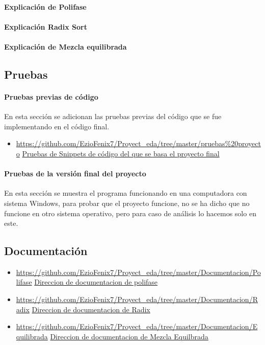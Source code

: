 \documentclass{article}
\begin{document}
	\paragraph*{Explicación de Polifase}
	
	\paragraph*{Explicación Radix Sort}
	
	\paragraph*{Explicación de Mezcla equilibrada}
	
	

	
	\subsection{Pruebas}
		\paragraph*{Pruebas previas de código}
		En esta sección se adicionan las pruebas previas del código que se fue implementando en el código final.
		
			\begin{itemize}
				\item \url{https://github.com/EzioFenix7/Proyect_eda/tree/master/pruebas\%20proyecto}
				\href{https://github.com/EzioFenix7/Proyect_eda/tree/master/pruebas\%20proyecto}{ Pruebas de Snippets de código del que se basa el proyecto final}
			\end{itemize}
		
		\paragraph*{Pruebas de la versión final del proyecto}
		En esta sección se muestra el programa funcionando en una computadora con sistema Windows, para probar que el proyecto funcione, no se ha dicho que no funcione en otro sistema operativo, pero para caso de análisis lo hacemos solo en este.
	\subsection{Documentación}
		\begin{itemize}
			\item \url{https://github.com/EzioFenix7/Proyect_eda/tree/master/Documentacion/Polifase}
			\href{https://github.com/EzioFenix7/Proyect_eda/tree/master/Documentacion/Polifase}{Direccion de documentacion de polifase}
			
			\item \url{https://github.com/EzioFenix7/Proyect_eda/tree/master/Documentacion/Radix}
			\href{https://github.com/EzioFenix7/Proyect_eda/tree/master/Documentacion/Radix}{Direccion de documentacion de Radix}
			
			\item 	\url{https://github.com/EzioFenix7/Proyect_eda/tree/master/Documentacion/Equilibrada}
			\href{https://github.com/EzioFenix7/Proyect_eda/tree/master/Documentacion/Equilibrada}{Direccion de documentacion de Mezcla Equilbrada}
		\end{itemize}
\end{document}
